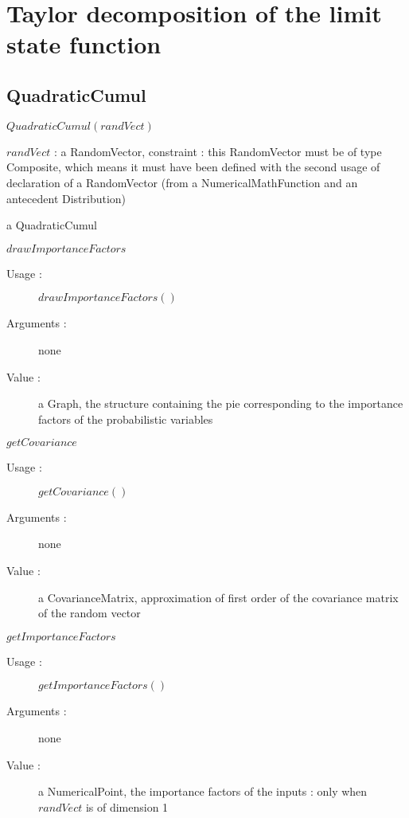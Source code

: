 \newpage

\section{Taylor decomposition of the limit state function}

\subsection{QuadraticCumul}
\begin{description}

\item[Usage :]  $QuadraticCumul(randVect)$

\item[Arguments :]  $randVect$ : a RandomVector, constraint : this RandomVector must be of type Composite, which means it must have been defined with the second usage of declaration of a RandomVector (from a NumericalMathFunction and an antecedent Distribution)

\item[Value :] a QuadraticCumul

\item[Some methods :]  \rule{0pt}{1em}

  \begin{description}

  \item $drawImportanceFactors$
    \begin{description}
    \item[Usage :] $drawImportanceFactors()$
    \item[Arguments :] none
    \item[Value :] a Graph, the structure containing the pie corresponding to the importance factors of the probabilistic variables
    \end{description}
    \bigskip

  \item $getCovariance$
    \begin{description}
    \item[Usage :] $getCovariance()$
    \item[Arguments :] none
    \item[Value :] a CovarianceMatrix, approximation of first order of the covariance matrix of the random vector
    \end{description}
    \bigskip

  \item $getImportanceFactors$
    \begin{description}
    \item[Usage :] $getImportanceFactors()$
    \item[Arguments :] none
    \item[Value :] a NumericalPoint, the importance factors of the inputs : only when $randVect$ is of dimension 1
    \end{description}


\end{description}
\end{description}
